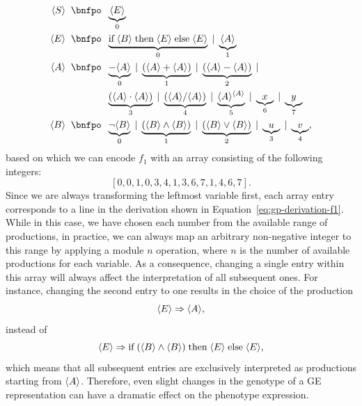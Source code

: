 \begin{equation*}
	\begin{split}
		\ps S \; \; \bnfpo & \; \; \underbrace{\ps E}_{0} \\
		\ps E \; \; \bnfpo & \; \; \underbrace{\text{if} \; \ps B \; \text{then} \; \ps E \; \text{else} \; \ps E}_{0} \; | \; \underbrace{\ps A}_{1} \\
		\ps A \; \; \bnfpo & \; \; \underbrace{-\ps A}_0 \; | \; \underbrace{(\ps A + \ps A)}_{1} \; | \; \underbrace{(\ps A - \ps A)}_2 \; |   \\  
		&  \; \; \underbrace{(\ps A \cdot \ps A)}_{3} \; | \; \underbrace{(\ps A / \ps A)}_{4} \; | \; \underbrace{\ps{A}^{\ps A}}_{5} \; | \; \underbrace{x}_{6} \; | \; \underbrace{y}_{7} \\
		\ps B \; \; \bnfpo & \; \; \underbrace{\neg \ps B}_{0} \; | \; \underbrace{(\ps B \wedge \ps B)}_{1} \; | \; \underbrace{(\ps B \vee \ps B)}_{2} \; | \; \underbrace{u}_3 \; | \; \underbrace{v}_4,
	\end{split}
	\label{eq:gp-example-grammar-ge-encoding}
\end{equation*}
based on which we can encode $f_1$ with an array consisting of the following integers:
\begin{equation*}
	\left[ 0, 0, 1, 0, 3, 4, 1, 3, 6, 7, 1, 4, 6, 7 \right].
\end{equation*}
Since we are always transforming the leftmost variable first, each array entry corresponds to a line in the derivation shown in Equation~\eqref{eq:gp-derivation-f1}.
While in this case, we have chosen each number from the available range of productions, in practice, we can always map an arbitrary non-negative integer to this range by applying a module $n$ operation, where $n$ is the number of available productions for each variable.
As a consequence, changing a single entry within this array will always affect the interpretation of all subsequent ones.
For instance, changing the second entry to one results in the choice of the production 
\begin{equation*}
	\langle E \rangle \Rightarrow \langle A \rangle,
\end{equation*}
instead of 
\begin{equation*}
	\langle E \rangle \Rightarrow \text{if} \; (\langle B \rangle \wedge \langle B \rangle) \; \text{then} \; \langle E \rangle \; \text{else} \; \langle E \rangle,
\end{equation*}
which means that all subsequent entries are exclusively interpreted as productions starting from $\langle A \rangle$.
Therefore, even slight changes in the genotype of a GE representation can have a dramatic effect on the phenotype expression.

